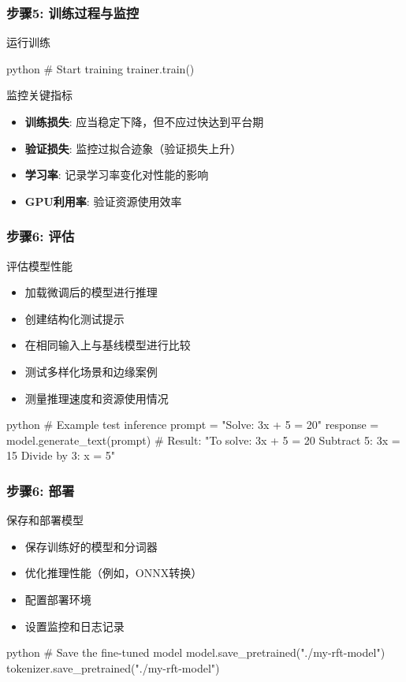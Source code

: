 \documentclass[aspectratio=169]{beamer}
\begin{document}
\begin{frame}[fragile]
	\frametitle{步骤5: 训练过程与监控}
	\begin{block}{运行训练}
		\begin{mintedbox}{python}
# Start training
trainer.train()
		\end{mintedbox}
	\end{block}
	\begin{block}{监控关键指标}
		\begin{itemize}
			\item \textbf{训练损失}: 应当稳定下降，但不应过快达到平台期
			\item \textbf{验证损失}: 监控过拟合迹象（验证损失上升）
			\item \textbf{学习率}: 记录学习率变化对性能的影响
			\item \textbf{GPU利用率}: 验证资源使用效率
		\end{itemize}
	\end{block}
\end{frame}

\begin{frame}[fragile]
	\frametitle{步骤6: 评估}
	\begin{block}{评估模型性能}
		\begin{itemize}
			\item 加载微调后的模型进行推理
			\item 创建结构化测试提示
			\item 在相同输入上与基线模型进行比较
			\item 测试多样化场景和边缘案例
			\item 测量推理速度和资源使用情况
		\end{itemize}
	\end{block}
	\begin{mintedbox}{python}
# Example test inference
prompt = "Solve: 3x + 5 = 20"
response = model.generate_text(prompt)
# Result: "To solve: 3x + 5 = 20
Subtract 5: 3x = 15
Divide by 3: x = 5"
	\end{mintedbox}
\end{frame}

\begin{frame}[fragile]
	\frametitle{步骤6: 部署}
	\begin{block}{保存和部署模型}
		\begin{itemize}
			\item 保存训练好的模型和分词器
			\item 优化推理性能（例如，ONNX转换） 
			\item 配置部署环境
			\item 设置监控和日志记录
		\end{itemize}
	\end{block}
	\begin{mintedbox}{python}
# Save the fine-tuned model
model.save_pretrained("./my-rft-model")
tokenizer.save_pretrained("./my-rft-model")
	\end{mintedbox}
\end{frame}
\end{document}
